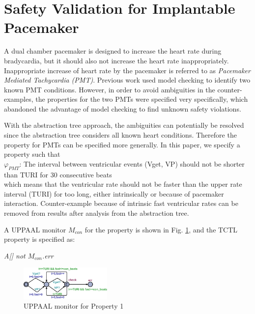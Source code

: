 \section{Safety Validation for Implantable Pacemaker}
A dual chamber pacemaker is designed to increase the heart rate during bradycardia, but it should also not increase the heart rate inappropriately.
Inappropriate increase of heart rate by the pacemaker is referred to as \emph{Pacemaker Mediated Tachycardia (PMT)}.
Previous work \cite{STTT13} used model checking to identify two known PMT conditions.
However, in order to avoid ambiguities in the counter-examples, the properties for the two PMTs were specified very specifically, which abandoned the advantage of model checking to find unknown safety violations.

With the abstraction tree approach, the ambiguities can potentially be resolved since the abstraction tree considers all known heart conditions.
Therefore the property for PMTs can be specified more generally.
In this paper, we specify a property such that\\
$\varphi_{PMT}$: The interval between ventricular events (Vget, VP) should not be shorter than TURI for 30 consecutive beats\\
which means that the ventricular rate should not be faster than the upper rate interval (TURI) for too long, either intrinsically or because of pacemaker interaction.
Counter-example because of intrinsic fast ventricular rates can be removed from results after analysis from the abstraction tree.

A UPPAAL monitor $M_{con}$ for the property is shown in Fig. \ref{fig:monitor}, and the TCTL property is specified as:\\
\begin{center}
\emph{A[] not $M_{con}$.err}
\end{center}

\begin{figure}[!t]
	\centering
	\includegraphics[width=0.4\textwidth]{figs/monitor.png}
	\caption{\small UPPAAL monitor for Property 1}
	\label{fig:monitor}
\end{figure}

